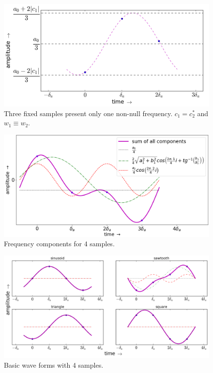  \begin{figure}
     \centering
         \includegraphics[width=.7\textwidth]{figures/amostras3b_}
     \caption{Three fixed samples present only one non-null frequency. $c_1=c_2^*$ and $w_1 \equiv w_2$.}
         \label{fig:amostras3}
 \end{figure}

\begin{figure}
    \centering
        \includegraphics[width=.7\textwidth]{figures/amostras4____}
    \caption{Frequency components for 4 samples.}
        \label{fig:amostras4}
\end{figure}


\begin{figure}
    \centering
        \includegraphics[width=.9\textwidth]{figures/amostras4formas___}
    \caption{Basic wave forms with 4 samples.}
        \label{fig:formas4}
\end{figure}

